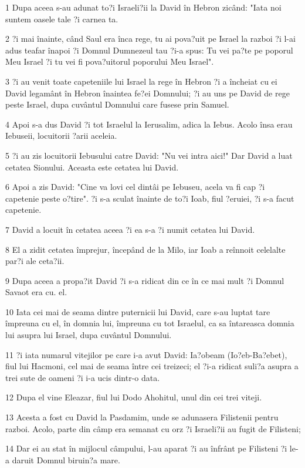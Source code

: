\par 1 Dupa aceea s-au adunat to?i Israeli?ii la David în Hebron zicând: "Iata noi suntem oasele tale ?i carnea ta.
\par 2 ?i mai înainte, când Saul era înca rege, tu ai pova?uit pe Israel la razboi ?i l-ai adus teafar înapoi ?i Domnul Dumnezeul tau ?i-a spus: Tu vei pa?te pe poporul Meu Israel ?i tu vei fi pova?uitorul poporului Meu Israel".
\par 3 ?i au venit toate capeteniile lui Israel la rege în Hebron ?i a încheiat cu ei David legamânt în Hebron înaintea fe?ei Domnului; ?i au uns pe David de rege peste Israel, dupa cuvântul Domnului care fusese prin Samuel.
\par 4 Apoi s-a dus David ?i tot Israelul la Ierusalim, adica la Iebus. Acolo însa erau Iebuseii, locuitorii ?arii aceleia.
\par 5 ?i au zis locuitorii Iebusului catre David: "Nu vei intra aici!" Dar David a luat cetatea Sionului. Aceasta este cetatea lui David.
\par 6 Apoi a zis David: "Cine va lovi cel dintâi pe Iebuseu, acela va fi cap ?i capetenie peste o?tire". ?i s-a sculat înainte de to?i Ioab, fiul ?eruiei, ?i s-a facut capetenie.
\par 7 David a locuit în cetatea aceea ?i ea s-a ?i numit cetatea lui David.
\par 8 El a zidit cetatea împrejur, începând de la Milo, iar Ioab a reînnoit celelalte par?i ale ceta?ii.
\par 9 Dupa aceea a propa?it David ?i s-a ridicat din ce în ce mai mult ?i Domnul Savaot era cu. el.
\par 10 Iata cei mai de seama dintre puternicii lui David, care s-au luptat tare împreuna cu el, în domnia lui, împreuna cu tot Israelul, ca sa întareasca domnia lui asupra lui Israel, dupa cuvântul Domnului.
\par 11 ?i iata numarul vitejilor pe care i-a avut David: Ia?obeam (Io?eb-Ba?ebet), fiul lui Hacmoni, cel mai de seama între cei treizeci; el ?i-a ridicat suli?a asupra a trei sute de oameni ?i i-a ucis dintr-o data.
\par 12 Dupa el vine Eleazar, fiul lui Dodo Ahohitul, unul din cei trei viteji.
\par 13 Acesta a fost cu David la Pasdamim, unde se adunasera Filistenii pentru razboi. Acolo, parte din câmp era semanat cu orz ?i Israeli?ii au fugit de Filisteni;
\par 14 Dar ei au stat în mijlocul câmpului, l-au aparat ?i au înfrânt pe Filisteni ?i le-a daruit Domnul biruin?a mare.
